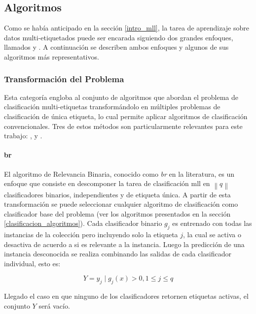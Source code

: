 \subsection{Algoritmos}

Como se había anticipado en la sección \ref{intro_mll}, la tarea de aprendizaje
sobre datos multi-etiquetados puede ser encarada siguiendo dos grandes enfoques,
llamados  y . A continuación se describen ambos enfoques y algunos de sus
algoritmos más representativos.

\subsubsection{Transformación del Problema} 

Esta categoría engloba al conjunto de algoritmos que abordan el problema de
clasificación multi-etiquetas transformándolo en múltiples problemas de
clasificación de única etiqueta, lo cual permite aplicar algoritmos de
clasificación convencionales. Tres de estos métodos son particularmente
relevantes para este trabajo: ,  y
.

\paragraph{\acrfull{br}}

El algoritmo de Relevancia Binaria, conocido como \textit{\acrlong{br}} en la
literatura, es un enfoque que consiste en descomponer la tarea de clasificación
\acrshort{mll} en $\left\|q\right\|$ clasificadores binarios, independientes y
de etiqueta única.  A partir de esta transformación se puede seleccionar
cualquier algoritmo de clasificación como clasificador base del problema (ver
los algoritmos presentados en la sección \ref{clasificacion_algoritmos}).  Cada
clasificador binario $g_{j}$ es entrenado con todas las instancias de la
colección pero incluyendo solo la etiqueta $j$, la cual se activa o desactiva de
acuerdo a si es relevante a la instancia. Luego la predicción de una instancia
desconocida se realiza combinando las salidas de cada clasificador individual,
esto es: 

\begin{equation}
   Y = {y_{j} \mid g_{j}(x) > 0, 1 \leq j \leq q}
\end{equation}
 
Llegado el caso en que ninguno de los clasificadores retornen etiquetas activas,
el conjunto $Y$ será vacío.

